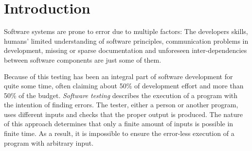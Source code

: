 \chapter{Introduction}
Software systems are prone to error due to multiple factors: The developers skills, humans' limited understanding of software principles, communication problems in development, missing or sparse documentation and unforeseen inter-dependencies between software components are just some of them.

Because of this testing has been an integral part of software development for quite some time, often claiming about 50\% of development effort and more than 50\% of the budget.\cite{Myers2011}
\emph{Software testing} describes the execution of a program with the intention of finding errors.
The tester, either a person or another program, uses different inputs and checks that the proper output is produced.
The nature of this approach determines that only a finite amount of inputs is possible in finite time.
As a result, it is impossible to ensure the error-less execution of a program with arbitrary input.


